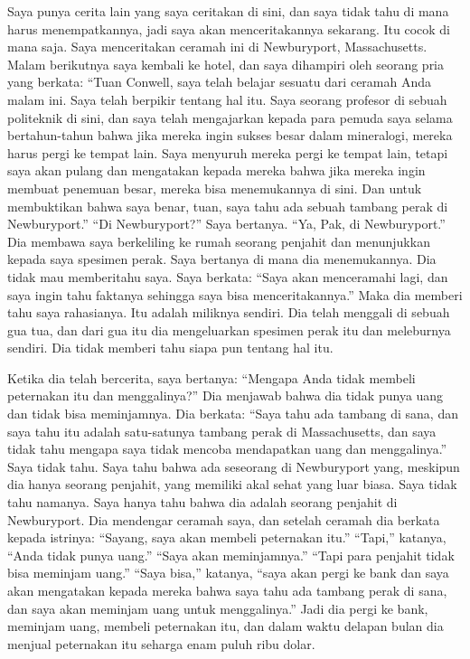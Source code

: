 \documentclass[
  letterpaper,
  DIV=11,
  numbers=noendperiod]{scrreprt}
\begin{document}
Saya punya cerita lain yang saya ceritakan di sini, dan saya tidak tahu
di mana harus menempatkannya, jadi saya akan menceritakannya sekarang.
Itu cocok di mana saja. Saya menceritakan ceramah ini di Newburyport,
Massachusetts. Malam berikutnya saya kembali ke hotel, dan saya
dihampiri oleh seorang pria yang berkata: ``Tuan Conwell, saya telah
belajar sesuatu dari ceramah Anda malam ini. Saya telah berpikir tentang
hal itu. Saya seorang profesor di sebuah politeknik di sini, dan saya
telah mengajarkan kepada para pemuda saya selama bertahun-tahun bahwa
jika mereka ingin sukses besar dalam mineralogi, mereka harus pergi ke
tempat lain. Saya menyuruh mereka pergi ke tempat lain, tetapi saya akan
pulang dan mengatakan kepada mereka bahwa jika mereka ingin membuat
penemuan besar, mereka bisa menemukannya di sini. Dan untuk membuktikan
bahwa saya benar, tuan, saya tahu ada sebuah tambang perak di
Newburyport.'' ``Di Newburyport?'' Saya bertanya. ``Ya, Pak, di
Newburyport.'' Dia membawa saya berkeliling ke rumah seorang penjahit
dan menunjukkan kepada saya spesimen perak. Saya bertanya di mana dia
menemukannya. Dia tidak mau memberitahu saya. Saya berkata: ``Saya akan
menceramahi lagi, dan saya ingin tahu faktanya sehingga saya bisa
menceritakannya.'' Maka dia memberi tahu saya rahasianya. Itu adalah
miliknya sendiri. Dia telah menggali di sebuah gua tua, dan dari gua itu
dia mengeluarkan spesimen perak itu dan meleburnya sendiri. Dia tidak
memberi tahu siapa pun tentang hal itu.

Ketika dia telah bercerita, saya bertanya: ``Mengapa Anda tidak membeli
peternakan itu dan menggalinya?'' Dia menjawab bahwa dia tidak punya
uang dan tidak bisa meminjamnya. Dia berkata: ``Saya tahu ada tambang di
sana, dan saya tahu itu adalah satu-satunya tambang perak di
Massachusetts, dan saya tidak tahu mengapa saya tidak mencoba
mendapatkan uang dan menggalinya.'' Saya tidak tahu. Saya tahu bahwa ada
seseorang di Newburyport yang, meskipun dia hanya seorang penjahit, yang
memiliki akal sehat yang luar biasa. Saya tidak tahu namanya. Saya hanya
tahu bahwa dia adalah seorang penjahit di Newburyport. Dia mendengar
ceramah saya, dan setelah ceramah dia berkata kepada istrinya: ``Sayang,
saya akan membeli peternakan itu.'' ``Tapi,'' katanya, ``Anda tidak
punya uang.'' ``Saya akan meminjamnya.'' ``Tapi para penjahit tidak bisa
meminjam uang.'' ``Saya bisa,'' katanya, ``saya akan pergi ke bank dan
saya akan mengatakan kepada mereka bahwa saya tahu ada tambang perak di
sana, dan saya akan meminjam uang untuk menggalinya.'' Jadi dia pergi ke
bank, meminjam uang, membeli peternakan itu, dan dalam waktu delapan
bulan dia menjual peternakan itu seharga enam puluh ribu dolar.
\end{document}
